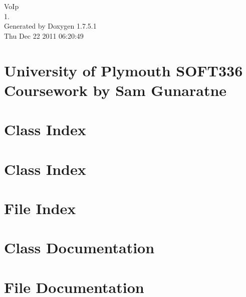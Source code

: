 \documentclass[a4paper]{book}
\begin{document}
\hypersetup{pageanchor=false,citecolor=blue}
\begin{titlepage}
\vspace*{7cm}
\begin{center}
{\Large \-Vo\-Ip \\[1ex]\large 1. }\\
\vspace*{1cm}
{\large \-Generated by Doxygen 1.7.5.1}\\
\vspace*{0.5cm}
{\small Thu Dec 22 2011 06:20:49}\\
\end{center}
\end{titlepage}
\clearemptydoublepage
{}
\tableofcontents
\clearemptydoublepage
{}
\hypersetup{pageanchor=true,citecolor=blue}
\chapter{\-University of \-Plymouth \-S\-O\-F\-T336 \-Coursework by \-Sam \-Gunaratne}
\label{index}\hypertarget{index}{}
\chapter{\-Class \-Index}

\chapter{\-Class \-Index}

\chapter{\-File \-Index}

\chapter{\-Class \-Documentation}













\chapter{\-File \-Documentation}



























\printindex
\end{document}
